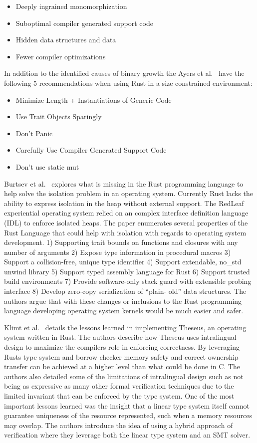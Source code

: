 \documentclass[sigconf]{acmart}
\begin{document}
\begin{itemize}
    \item Deeply ingrained monomorphization
    \item Suboptimal compiler generated support code
    \item Hidden data structures and data
    \item Fewer compiler optimizations
\end{itemize}

In addition to the identified causes of binary growth the Ayers et al.~\cite{Ayers2022-sf} have the
following 5 recommendations when using Rust in a size constrained environment:
\begin{itemize}
  \item Minimize Length + Instantiations of Generic Code
  \item Use Trait Objects Sparingly
  \item Don't Panic
  \item Carefully Use Compiler Generated Support Code
  \item Don't use static mut
\end{itemize}

Burtsev et al.~\cite{Burtsev2021-mh} explores what is missing in the Rust programming language to
help solve the isolation problem in an operating system. Currently Rust lacks the ability to express
isolation in the heap without external support. The RedLeaf experiential operating system relied on
an complex interface definition language (IDL) to enforce isolated heaps. The paper enumerates
several properties of the Rust Language that could help with isolation with regards to operating
system development. 1) Supporting trait bounds on functions and closures with any number of
arguments 2) Expose type information in procedural macros 3) Support a collision-free, unique type
identifier 4) Support extendable, no\_std unwind library 5) Support typed assembly language for Rust
6) Support trusted build environments 7) Provide software-only stack guard with extensible probing
interface 8) Develop zero-copy serialization of “plain- old” data structures. The authors argue that
with these changes or inclusions to the Rust programming language developing operating system
kernels would be much easier and safer.

Klimt et al.~\cite{Klimt2023-ob} details the lessons learned in implementing Theseus, an operating
system written in Rust. The authors describe how Theseus uses intralingual design to maximize the
compilers role in enforcing correctness. By leveraging Rusts type system and borrow checker memory
safety and correct ownership transfer can be achieved at a higher level than what could be done in
C. The authors also detailed some of the limitations of intralingual design such as not being as
expressive as many other formal verification techniques due to the limited invariant that can be
enforced by the type system. One of the most important lessons learned was the insight that a linear
type system itself cannot guarantee uniqueness of the resource represented, such when a memory
resources may overlap. The authors introduce the idea of using a hybrid approach of verification
where they leverage both the linear type system and an SMT solver.
\end{document}
